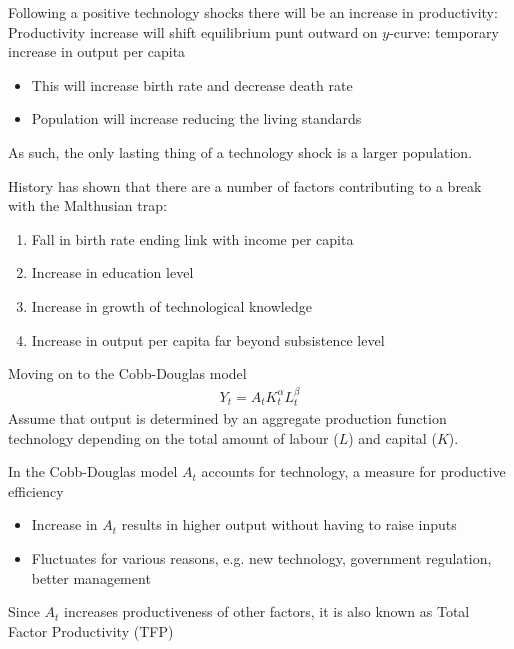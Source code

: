 \documentclass{beamer}
\begin{document}
\begin{frame}
  Following a positive technology shocks there will be an increase in productivity:   
  Productivity increase will shift equilibrium punt outward on $y$-curve: temporary increase in output per capita
  \begin{itemize}    
    \item This will increase birth rate and decrease death rate
    \item Population will increase reducing the living standards
  \end{itemize}
  \medskip
  As such, the only lasting thing of a technology shock is a larger population.
\end{frame}

\begin{frame}
 History has shown that there are a number of factors contributing to a break with the Malthusian trap:
\begin{enumerate}
  \item Fall in birth rate ending link with income per capita
  \item Increase in education level
  \item Increase in growth of technological knowledge
  \item Increase in output per capita far beyond subsistence level
\end{enumerate}
\end{frame}

\begin{frame}
 Moving on to the Cobb-Douglas model  
\begin{align}
  Y_t=A_tK^{\alpha}_tL^{\beta}_t
\end{align}
  \medskip
  Assume that output is determined by an aggregate production function technology depending on the total amount of labour ($L$) and capital ($K$). 
\end{frame}

\begin{frame}
  In the Cobb-Douglas model $A_t$ accounts for technology, a measure for productive efficiency
\begin{itemize}
  \item Increase in $A_t$ results in higher output without having to raise inputs
  \item Fluctuates for various reasons, e.g. new technology, government regulation, better management
\end{itemize} 
\medskip
Since $A_t$ increases productiveness of other factors, it is also known as Total Factor Productivity (TFP)
\end{frame}
\end{document}
